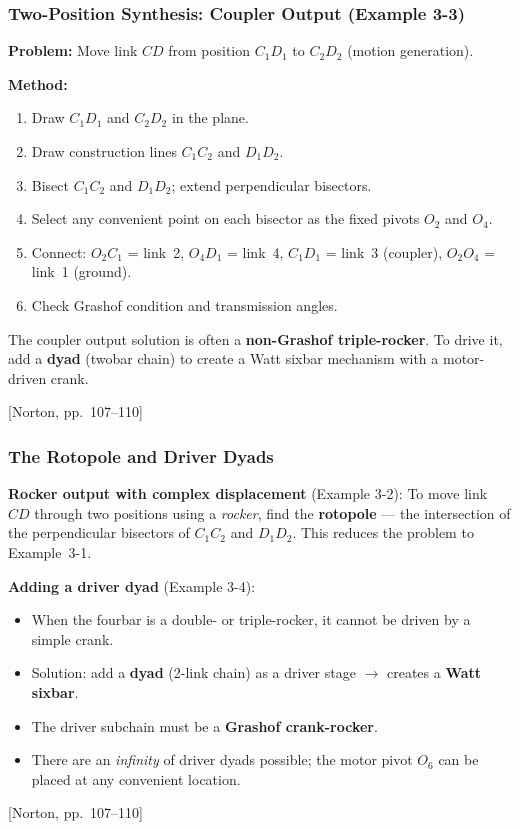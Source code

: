 \documentclass[10pt,aspectratio=43]{beamer}
\newcommand{\pref}[1]{\vfill\hfill{\scriptsize\color{gray}[Norton, pp.~#1]}}
\begin{document}
\begin{frame}
\frametitle{Two-Position Synthesis: Coupler Output (Example 3-3)}

\textbf{Problem:} Move link $CD$ from position $C_1D_1$ to $C_2D_2$ (motion generation).

\vspace{4pt}
\textbf{Method:}
\begin{enumerate}
  \item Draw $C_1D_1$ and $C_2D_2$ in the plane.
  \item Draw construction lines $C_1C_2$ and $D_1D_2$.
  \item Bisect $C_1C_2$ and $D_1D_2$; extend perpendicular bisectors.
  \item Select any convenient point on each bisector as the fixed pivots $O_2$ and $O_4$.
  \item Connect: $O_2C_1$ = link~2, $O_4D_1$ = link~4, $C_1D_1$ = link~3 (coupler), $O_2O_4$ = link~1 (ground).
  \item Check Grashof condition and transmission angles.
\end{enumerate}

\vspace{4pt}
\begin{redbox}
The coupler output solution is often a \textbf{non-Grashof triple-rocker}. To drive it, add a \textbf{dyad} (twobar chain) to create a Watt sixbar mechanism with a motor-driven crank.
\end{redbox}
\pref{107--110}
\end{frame}

\begin{frame}
\frametitle{The Rotopole and Driver Dyads}

\textbf{Rocker output with complex displacement} (Example 3-2): To move link $CD$ through two positions using a \emph{rocker}, find the \textbf{rotopole} --- the intersection of the perpendicular bisectors of $C_1C_2$ and $D_1D_2$. This reduces the problem to Example~3-1.

\vspace{6pt}
\textbf{Adding a driver dyad} (Example 3-4):
\begin{itemize}
  \item When the fourbar is a double- or triple-rocker, it cannot be driven by a simple crank.
  \item Solution: add a \textbf{dyad} (2-link chain) as a driver stage $\to$ creates a \textbf{Watt sixbar}.
  \item The driver subchain must be a \textbf{Grashof crank-rocker}.
  \item There are an \emph{infinity} of driver dyads possible; the motor pivot $O_6$ can be placed at any convenient location.
\end{itemize}
\pref{107--110}
\end{frame}
\end{document}
